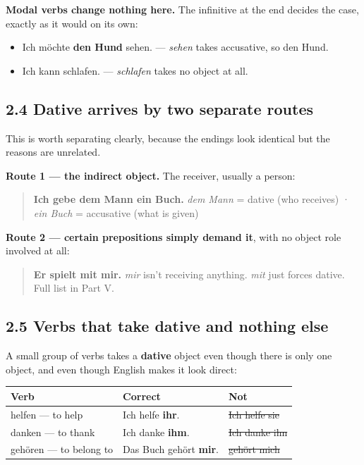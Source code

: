 \documentclass[
  11pt,
]{article}
\newcounter{none} %
\providecommand{\tightlist}{%
  \setlength{\itemsep}{0pt}\setlength{\parskip}{0pt}}
\begin{document}
\textbf{Modal verbs change nothing here.} The infinitive at the end
decides the case, exactly as it would on its own:

\begin{itemize}
\tightlist
\item
  Ich möchte \textbf{den Hund} sehen. --- \emph{sehen} takes accusative,
  so den Hund.
\item
  Ich kann schlafen. --- \emph{schlafen} takes no object at all.
\end{itemize}

\subsection{2.4 Dative arrives by two separate
routes}\label{dative-arrives-by-two-separate-routes}

This is worth separating clearly, because the endings look identical but
the reasons are unrelated.

\textbf{Route 1 --- the indirect object.} The receiver, usually a
person:

\begin{quote}
\textbf{Ich gebe dem Mann ein Buch.} \emph{dem Mann} = dative (who
receives) · \emph{ein Buch} = accusative (what is given)
\end{quote}

\textbf{Route 2 --- certain prepositions simply demand it}, with no
object role involved at all:

\begin{quote}
\textbf{Er spielt mit mir.} \emph{mir} isn't receiving anything.
\emph{mit} just forces dative. Full list in Part V.
\end{quote}

\subsection{2.5 Verbs that take dative and nothing
else}\label{verbs-that-take-dative-and-nothing-else}

A small group of verbs takes a \textbf{dative} object even though there
is only one object, and even though English makes it look direct:

{\def\LTcaptype{none} %
\begin{longtable}[]{@{}lll@{}}
\toprule\noalign{}
Verb & Correct & Not \\
\midrule\noalign{}
\endhead
\bottomrule\noalign{}
\endlastfoot
helfen --- to help & Ich helfe \textbf{ihr}. & \st{Ich helfe sie} \\
danken --- to thank & Ich danke \textbf{ihm}. & \st{Ich danke ihn} \\
gehören --- to belong to & Das Buch gehört \textbf{mir}. & \st{gehört
mich} \\
\end{longtable}
}
\end{document}
